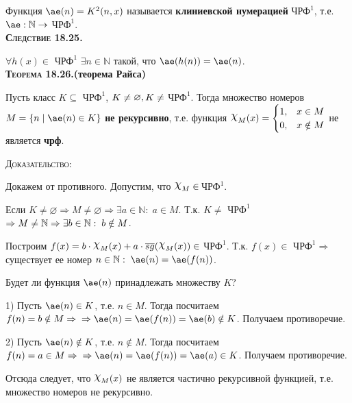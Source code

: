 \documentclass[18pt, a4paper]{extarticle}
\newcommand{\sled}[1]{\textbf{\textsc{Следствие #1}}}
\newcommand{\teor}[1]{\textbf{\textsc{Теорема #1}}}
\newcommand{\dok}{\textsc{Доказательство:}}
\begin{document}
Функция $\ae(n)=K^2(n,x)$ называется \textbf{клиниевской нумерацией} \textbf{$\text{ЧРФ}^1$}, т.е. $\ae:\mathbb N\to$ \textbf{$\text{ЧРФ}^1$}.\\

\sled{18.25.} 

$\forall h(x)\in$ \textbf{$\text{ЧРФ}^1$} $\exists n\in\mathbb N$ такой, что $\ae(h(n))=\ae(n)$.\\

\teor{18.26.}\textbf{(теорема Райса)}

Пусть класс $K\subseteq$ \textbf{$\text{ЧРФ}^1$}, $K\neq\varnothing,\newline K\neq$ \textbf{$\text{ЧРФ}^1$}. Тогда множество номеров $M=\{n\;|\;\ae(n)\in K\}$ \textbf{не рекурсивно}, т.е. функция $\raisebox{.5ex}{\scalebox{1.2}{$\chi$}}_M(x)=
\begin{cases}
   1, &x\in M\\
   0, &x\notin M
\end{cases}$ не является \textbf{чрф}.

\dok

Докажем от противного. Допустим, что $\raisebox{.5ex}{\scalebox{1.2}{$\chi$}}_M\in\,$\textbf{$\text{ЧРФ}^1$}. 

Если $K\neq\varnothing\Rightarrow M\neq\varnothing\Rightarrow\exists a\in\mathbb N:\;a\in M$. Т.к. $K\neq$ \textbf{$\text{ЧРФ}^1$} $\Rightarrow \newline M\neq\mathbb N\Rightarrow\exists b\in\mathbb N:\;b\notin M$. 

Построим $f(x)=b\cdot\raisebox{.5ex}{\scalebox{1.2}{$\chi$}}_M(x)+a\cdot\overline{sg}(\raisebox{.5ex}{\scalebox{1.2}{$\chi$}}_M(x))\in$ \textbf{$\text{ЧРФ}^1$}. Т.к. $f(x)\in$ \textbf{$\text{ЧРФ}^1$}$\Rightarrow$ существует ее номер $n\in\mathbb N:\;\ae(n)=\ae(f(n))$. 

Будет ли функция $\ae(n)$ принадлежать множеству $K$?

1) Пусть $\ae(n)\in K$, т.е. $n\in M$. Тогда посчитаем $f(n)=b\notin M\Rightarrow\newline\Rightarrow\ae(n)=\ae(f(n))=\ae(b)\notin K$. Получаем противоречие.

2) Пусть $\ae(n)\notin K$, т.е. $n\notin M$. Тогда посчитаем $f(n)=a\in M\Rightarrow\newline\Rightarrow\ae(n)=\ae(f(n))=\ae(a)\in K$. Получаем противоречие.

Отсюда следует, что $\raisebox{.5ex}{\scalebox{1.2}{$\chi$}}_M(x)$ не является частично рекурсивной функцией, т.е. множество номеров не рекурсивно.
\end{document}
